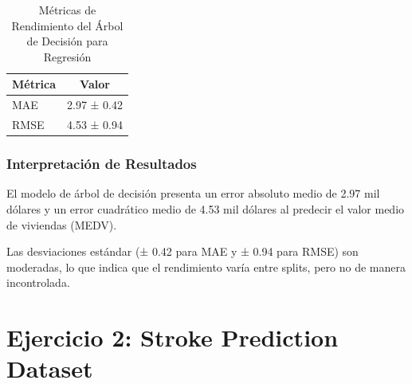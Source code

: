 \documentclass[12pt,a4paper]{article}
\begin{document}
\begin{table}[H]
\centering
\caption{Métricas de Rendimiento del Árbol de Decisión para Regresión}\label{tab:dtree_resultados}
\begin{tabular}{lc}
\toprule
\textbf{Métrica} & \textbf{Valor} \\
\midrule
MAE & 2.97 ± 0.42 \\
RMSE & 4.53 ± 0.94 \\
\bottomrule
\end{tabular}
\end{table}

\subsubsection{Interpretación de Resultados}

El modelo de árbol de decisión presenta un error absoluto medio de 2.97 mil dólares y un error cuadrático medio de 4.53 mil dólares al predecir el valor medio de viviendas (MEDV).

Las desviaciones estándar (± 0.42 para MAE y ± 0.94 para RMSE) son moderadas, lo que indica que el rendimiento varía entre splits, pero no de manera incontrolada.

\section{Ejercicio 2: Stroke Prediction Dataset}
\end{document}
